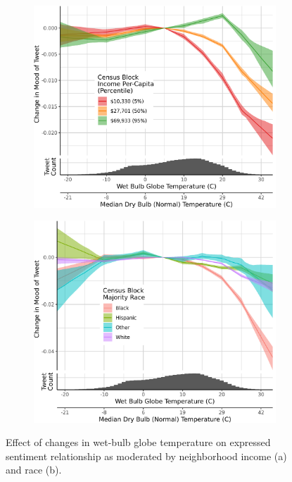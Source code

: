 \documentclass{article}
\begin{document}
\begin{figure}[H]
\centering
\begin{subfigure}{.5\textwidth}
  \centering
  \includegraphics[width=\linewidth]{../res/wbgt-income.png}
  \caption{}
  \label{fig:sub1}
\end{subfigure}%
\begin{subfigure}{.5\textwidth}
  \centering
  \includegraphics[width=\linewidth]{../res/wbgt-race_q.png}
  \caption{}
  \label{fig:sub2}
\end{subfigure}
\caption{Effect of changes in wet-bulb globe temperature on expressed sentiment relationship as moderated by neighborhood income (a) and race (b).}
\label{fig:test}
\end{figure}
\end{document}
